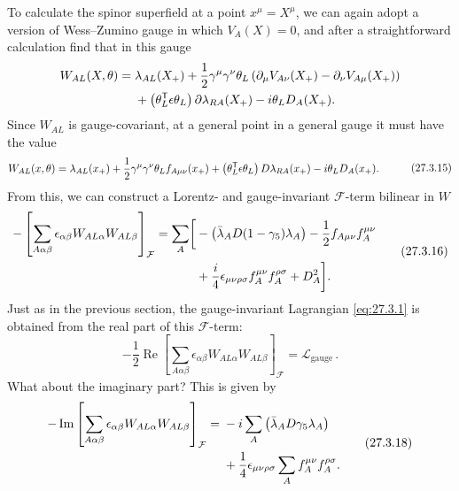 To calculate the spinor superfield at a point \(x^\mu=X^\mu\), we can
again adopt a version of Wess--Zumino gauge in which \(V_A(X)=0\), and
after a straightforward calculation find that in this gauge
\[
  \begin{aligned}
  W_{AL}(X,\theta)={}&
  \lambda_{AL}(X_+)
  +\frac12\gamma^\mu\gamma^\nu\theta_L
    \left(
      \partial_\mu V_{A\nu}(X_+)-\partial_\nu V_{A\mu}(X_+)
    \right)
  \\
  &+\left(\theta_L^{\mathsf T}\epsilon\theta_L\right)
    \sl{\partial}\lambda_{RA}(X_+)
  -i\theta_LD_A(X_+).
  \end{aligned}
\]
Since \(W_{AL}\) is gauge-covariant, at a general point in a general gauge
it must have the value
\begin{equation}
  \begin{aligned}
  W_{AL}(x,\theta)={}&
  \lambda_{AL}(x_+)
  +\frac12\gamma^\mu\gamma^\nu\theta_L f_{A\mu\nu}(x_+)
  +\left(\theta_L^{\mathsf T}\epsilon\theta_L\right)
    \sl{D}\lambda_{RA}(x_+)
  -i\theta_LD_A(x_+).
  \end{aligned}
  \tag{27.3.15}\label{eq:27.3.15}
\end{equation}
From this, we can construct a Lorentz- and gauge-invariant
\(\mathcal{F}\)-term bilinear in \(W\)
\begin{equation}
  \begin{aligned}
  -\left[
    \sum_{A\alpha\beta}
    \epsilon_{\alpha\beta}W_{AL\alpha}W_{AL\beta}
  \right]_{\mathcal{F}}
  =\sum_A\biggl[
    &-\left(\bar\lambda_A\sl{D}(1-\gamma_5)\lambda_A\right)
    -\frac12 f_{A\mu\nu}f_A^{\mu\nu}
  \\
    &+\frac{i}{4}\epsilon_{\mu\nu\rho\sigma}
      f_A^{\mu\nu}f_A^{\rho\sigma}
    +D_A^2
  \biggr].
  \end{aligned}
  \tag{27.3.16}\label{eq:27.3.16}
\end{equation}
Just as in the previous section, the gauge-invariant Lagrangian
\eqref{eq:27.3.1} is obtained from the real part of this
\(\mathcal{F}\)-term:
\begin{equation}
  -\frac12\operatorname{Re}\left[
    \sum_{A\alpha\beta}
    \epsilon_{\alpha\beta}W_{AL\alpha}W_{AL\beta}
  \right]_{\mathcal{F}}
  =\mathcal{L}_{\mathrm{gauge}}\,.
  \tag{27.3.17}\label{eq:27.3.17}
\end{equation}
What about the imaginary part? This is given by
\begin{equation}
  \begin{aligned}
  -\operatorname{Im}\left[
    \sum_{A\alpha\beta}
    \epsilon_{\alpha\beta}W_{AL\alpha}W_{AL\beta}
  \right]_{\mathcal{F}}
  ={}&
  -i\sum_A\left(\bar\lambda_A\sl{D}\gamma_5\lambda_A\right)
  \\
  &+\frac14\epsilon_{\mu\nu\rho\sigma}
    \sum_A f_A^{\mu\nu}f_A^{\rho\sigma}.
  \end{aligned}
  \tag{27.3.18}\label{eq:27.3.18}
\end{equation}
